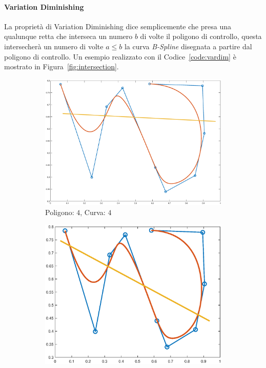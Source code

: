 \documentclass[a4paper, 10pt]{article}
\begin{document}
\paragraph{Variation Diminishing}
La proprietà di Variation Diminishing dice semplicemente che presa una qualunque retta che interseca
un numero $b$ di volte il poligono di controllo, questa intersecherà un numero di volte $a \leq b$ la curva \textit{B-Spline} 
disegnata a partire dal poligono di controllo. 
Un esempio realizzato con il Codice~\ref{code:vardim} è mostrato in Figura~\ref{fig:intersection}.

\begin{figure}[]
  \centering
  \begin{subfigure}[b]{0.3\textwidth}
    \includegraphics[width=\textwidth]{figure/intersection1.eps}
    \caption{Poligono: $4$, Curva: $4$}
    \label{fig:intersection1}
  \end{subfigure}
  \begin{subfigure}[b]{0.3\textwidth}
      \includegraphics[width=\textwidth]{figure/intersection3.eps}

\end{subfigure}
\end{figure}
\end{document}

